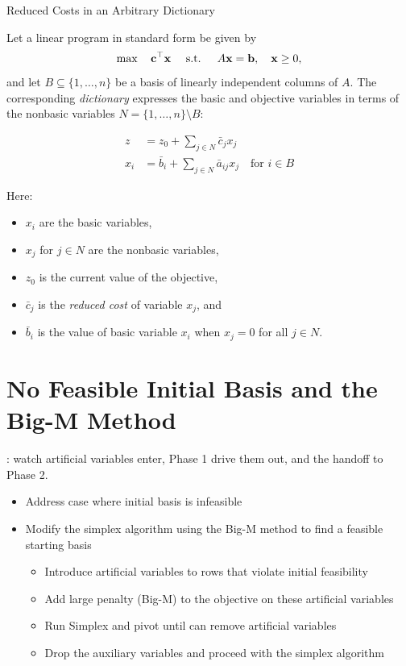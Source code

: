 \begin{definition}{Reduced Costs in an Arbitrary Dictionary}\label{def:reduced-cost-general}

Let a linear program in standard form be given by
\[
\max \quad \mathbf{c}^\top \mathbf{x} \quad \mbox{ s.t. } \quad A\mathbf{x} = \mathbf{b}, \quad \mathbf{x} \geq 0,
\]
and let \( B \subseteq \{1, \dots, n\} \) be a basis of linearly independent columns of \( A \). The corresponding \emph{dictionary} expresses the basic and objective variables in terms of the nonbasic variables \( N = \{1, \dots, n\} \setminus B \):

\[
\begin{aligned}
z &= z_0 + \sum_{j \in N} \bar{c}_j x_j \\
x_i &= \bar{b}_i + \sum_{j \in N} \bar{a}_{ij} x_j \quad \text{for } i \in B
\end{aligned}
\]

Here:
\begin{itemize}
    \item \( x_i \) are the basic variables,
    \item \( x_j \) for \( j \in N \) are the nonbasic variables,
    \item \( z_0 \) is the current value of the objective,
    \item \( \bar{c}_j \) is the \emph{reduced cost} of variable \( x_j \), and
    \item \( \bar{b}_i \) is the value of basic variable \( x_i \) when \( x_j = 0 \) for all \( j \in N \).
\end{itemize}
\end{definition}

\section{No Feasible Initial Basis and the Big-M Method}
\label{sec:big-m-dictionary}

\begin{tryit}
: watch artificial variables enter, Phase 1 drive them out, and the handoff to Phase 2.
\end{tryit}



\begin{outcome}
\begin{itemize}
\item Address case where initial basis is infeasible
\item Modify the simplex algorithm using the Big-M method to find a feasible starting basis
\begin{itemize}
\item Introduce artificial variables to rows that violate initial feasibility
\item Add large penalty (Big-M) to the objective on these artificial variables
\item Run Simplex and pivot until can remove artificial variables
\item Drop the auxiliary variables and proceed with the simplex algorithm
\end{itemize}
\end{itemize}
\end{outcome}


